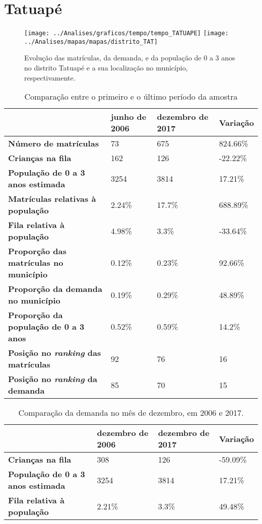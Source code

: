 \section{Tatuapé}
\begin{figure}[H]
	\centering
	\texttt{[image: ../Analises/graficos/tempo/tempo\_TATUAPE]}
	\texttt{[image: ../Analises/mapas/mapas/distrito\_TAT]}
	\caption{Evolução das matrículas, da demanda, e da população de 0 a 3 anos no distrito Tatuapé e a sua localização no município, respectivamente.}
\end{figure}
\begin{table}[H]
	\begin{tabular}{|l|l|l|l|}
		\hline
		\textbf{}                                      & \textbf{junho de 2006}       & \textbf{dezembro de 2017}    & \textbf{Variação} \\ \hline
		\textbf{Número de matrículas}                  & 73 & 675 & 824.66\% \\ \hline
		\textbf{Crianças na fila}                      & 162 & 126 & -22.22\% \\ \hline
		\textbf{População de 0 a 3 anos estimada}      & 3254 & 3814 & 17.21\% \\ \hline
		\textbf{Matrículas relativas à população}      & 2.24\% & 17.7\% & 688.89\% \\ \hline
		\textbf{Fila relativa à população}             & 4.98\% & 3.3\% & -33.64\% \\ \hline
		\textbf{Proporção das matrículas no município} & 0.12\% & 0.23\% & 92.66\% \\ \hline
		\textbf{Proporção da demanda no município}     & 0.19\% & 0.29\% & 48.89\% \\ \hline
		\textbf{Proporção da população de 0 a 3 anos}  & 0.52\% & 0.59\% & 14.2\% \\ \hline
		\textbf{Posição no \textit{ranking} das matrículas}     & 92 & 76 & 16 \\ \hline
		\textbf{Posição no \textit{ranking} da demanda}         & 85 & 70 & 15 \\ \hline
	\end{tabular}
	\caption{Comparação entre o primeiro e o último período da amostra}
\end{table}
\begin{table}[H]
	\begin{tabular}{|l|l|l|l|}
		\hline
		\textbf{}                                 & \textbf{dezembro de 2006} & \textbf{dezembro de 2017} & \textbf{Variação} \\ \hline
		\textbf{Crianças na fila}                      & 308 & 126 & -59.09\% \\ \hline
		\textbf{População de 0 a 3 anos estimada}      & 3254 & 3814 & 17.21\% \\ \hline
		\textbf{Fila relativa à população}             & 2.21\% & 3.3\% & 49.48\% \\ \hline
	\end{tabular}
	\caption{Comparação da demanda no mês de dezembro, em 2006 e 2017.}
\end{table}
